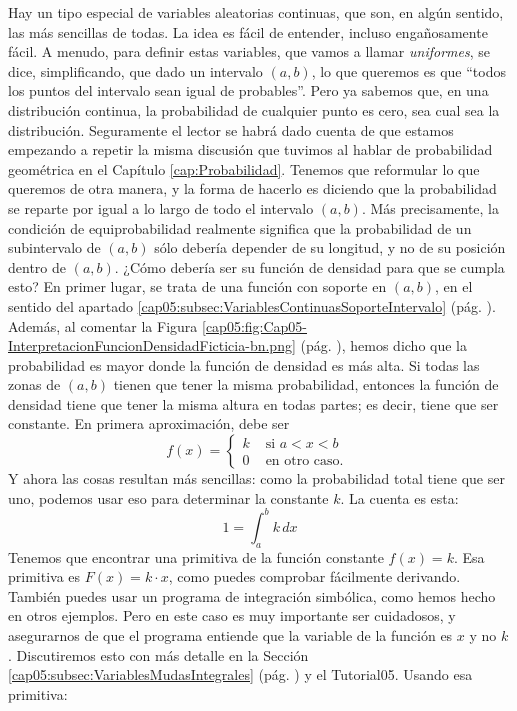 Hay un tipo especial de variables aleatorias continuas, que son, en algún sentido, las más sencillas de todas. La idea es fácil de entender, incluso engañosamente fácil. A menudo, para definir estas variables, que vamos a llamar {\em uniformes},  se dice, simplificando, que dado  un intervalo $(a,b)$, lo que queremos es que ``todos los puntos del intervalo sean igual de probables''. Pero ya sabemos que, en una distribución continua, la probabilidad de cualquier punto es cero, sea cual sea la distribución. Seguramente el lector se habrá dado cuenta de que estamos empezando a repetir la misma discusión que tuvimos al hablar de probabilidad geométrica en el Capítulo \ref{cap:Probabilidad}. Tenemos que reformular lo que queremos de otra manera, y la forma de hacerlo es diciendo que la probabilidad se reparte por igual a lo largo de todo el intervalo $(a,b)$. Más precisamente, la condición de equiprobabilidad realmente significa que la probabilidad de un subintervalo de $(a,b)$ sólo debería depender de su longitud, y no de su posición dentro de $(a,b)$. ¿Cómo debería ser su función de densidad para que se cumpla esto? En primer lugar, se trata de una función con soporte en $(a,b)$, en el sentido del apartado \ref{cap05:subsec:VariablesContinuasSoporteIntervalo} (pág. \pageref{cap05:subsec:VariablesContinuasSoporteIntervalo}). Además, al comentar la Figura \ref{cap05:fig:Cap05-InterpretacionFuncionDensidadFicticia-bn.png} (pág. \pageref{cap05:fig:Cap05-InterpretacionFuncionDensidadFicticia-bn.png}), hemos dicho que la probabilidad es mayor donde la función de densidad es más alta. Si todas las zonas de $(a,b)$ tienen que tener la misma probabilidad, entonces la función de densidad tiene que tener la misma altura en todas partes; es decir, tiene que ser constante. En primera aproximación, debe ser
\[
f(x)=\begin{cases}
k&\mbox{ si }a<x<b\\
0&\mbox{ en otro caso. }
\end{cases}
\]
Y ahora las cosas resultan más sencillas: como la probabilidad total tiene que ser uno, podemos usar eso para determinar la constante $k$. La cuenta es esta:
\[
1=\int_a^b k\, dx
\]
Tenemos que encontrar una primitiva de la función constante $f(x)=k$. Esa primitiva es $F(x)=k\cdot x$, como puedes comprobar fácilmente derivando. También puedes usar un programa de integración simbólica, como hemos hecho en otros ejemplos. Pero en este caso es muy importante ser cuidadosos, y asegurarnos de que el programa entiende que la variable de la función es $x$ y no $k$. Discutiremos esto con más detalle en la Sección \ref{cap05:subsec:VariablesMudasIntegrales} (pág. \pageref{cap05:subsec:VariablesMudasIntegrales}) y el Tutorial05. Usando esa primitiva:
